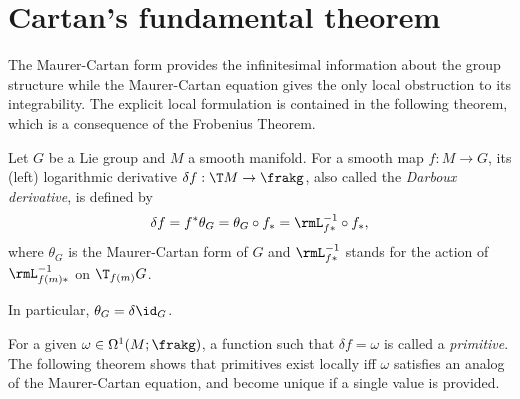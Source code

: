 \section{Cartan's fundamental theorem}\label{sec: Cartan's fundamental}

The Maurer-Cartan form provides the infinitesimal information about the group structure while the Maurer-Cartan equation gives the only local obstruction to its integrability. The explicit local formulation is contained in the following theorem, which is a consequence of the Frobenius Theorem.

\begin{defn}
    Let $G$ be a Lie group and $M$ a smooth manifold. For a smooth map $f:M\to G$, its (left) logarithmic derivative $\delta f:\T M\to \frakg$, also called the \emph{Darboux derivative}, is defined by
    \[\delta f=f^\ast\theta_G=\theta_G\circ f_\ast=\rmL_{f\ast}^{-1}\circ f_\ast,\]
    where $\theta_G$ is the Maurer-Cartan form of $G$ and $\rmL_{f\ast}^{-1}$ stands for the action of $\rmL_{f(m)\ast}^{-1}$ on $\T_{f(m)}G$.
    
    In particular, $\theta_G=\delta\id_G$.
\end{defn}

For a given $\omega\in \Omega^1(M;\frakg)$, a function such that $\delta f=\omega$ is called a \emph{primitive}. The following theorem shows that primitives exist locally iff $\omega$ satisfies an analog of the Maurer-Cartan equation, and become unique if a single value is provided.

